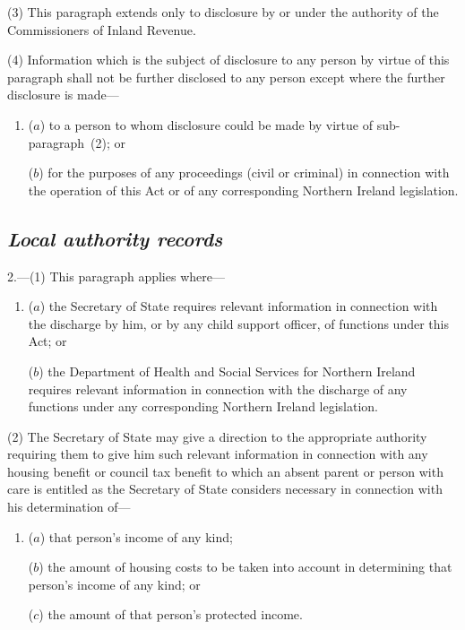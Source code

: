 \documentclass[12pt,a4paper]{article}
\begin{document}
(3) This paragraph extends only to disclosure by or under the authority of the Commissioners of Inland Revenue.

(4) Information which is the subject of disclosure to any person by virtue of this paragraph shall not be further disclosed to any person except where the further disclosure is made—
\begin{enumerate}\item[]
($a$) to a person to whom disclosure could be made by virtue of sub-\hspace{0pt}paragraph~(2); or

($b$) for the purposes of any proceedings (civil or criminal) in connection with the operation of this Act or of any corresponding Northern Ireland legislation.
\end{enumerate}


\subsection*{\itshape Local authority records}

2.---(1) This paragraph applies where—
\begin{enumerate}\item[]
($a$) the Secretary of State requires relevant information in connection with the discharge by him, or by any child support officer, of functions under this Act; or

($b$) the Department of Health and Social Services for Northern Ireland requires relevant information in connection with the discharge of any functions under any corresponding Northern Ireland legislation.
\end{enumerate}

(2) The Secretary of State may give a direction to the appropriate authority requiring them to give him such relevant information in connection with any housing benefit or 
council tax benefit  %
to which an absent parent or person with care is entitled as the Secretary of State considers necessary in connection with his determination of—
\begin{enumerate}\item[]
($a$) that person’s income of any kind;

($b$) the amount of housing costs to be taken into account in determining that person’s income of any kind; or

($c$) the amount of that person’s protected income.
\end{enumerate}
\end{document}

